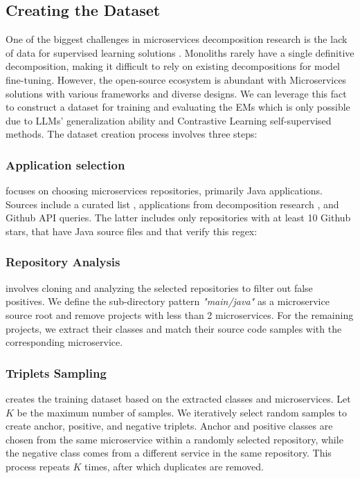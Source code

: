 \subsection{Creating the Dataset}\label{subsec:dataset}







One of the biggest challenges in microservices decomposition research is the lack of data for supervised learning solutions \cite{oumoussa2024decompsurvey,Abgaz2023decompsurvey}. Monoliths rarely have a single definitive decomposition, making it difficult to rely on existing decompositions for model fine-tuning. However, the open-source ecosystem is abundant with Microservices solutions with various frameworks and diverse designs. We can leverage this fact to construct a dataset for training and evaluating the EMs which is only possible due to LLMs' generalization ability and Contrastive Learning self-supervised methods. The dataset creation process involves three steps:


\subsubsection{Application selection} focuses on choosing microservices repositories, primarily Java applications. Sources include a curated list \cite{rahman2019curatedset}, applications from decomposition research \cite{khaled2022hierdecomp,kalia2021mono2micro,desai2021cogcn,faustino2022stepwise}, and Github API queries. The latter includes only repositories with at least 10 Github stars, that have Java source files and that verify this regex:
\begin{center}
\end{center}

\subsubsection{Repository Analysis} involves cloning and analyzing the selected repositories to filter out false positives. We define the sub-directory pattern \textit{"main/java"} as a microservice source root and remove projects with less than 2 microservices. For the remaining projects, we extract their classes and match their source code samples with the corresponding microservice.
\subsubsection{Triplets Sampling} creates the training dataset based on the extracted classes and microservices. Let  \( K \) be the maximum number of samples. We iteratively select random samples to create anchor, positive, and negative triplets. Anchor and positive classes are chosen from the same microservice within a randomly selected repository, while the negative class comes from a different service in the same repository. This process repeats  \( K \) times, after which duplicates are removed.